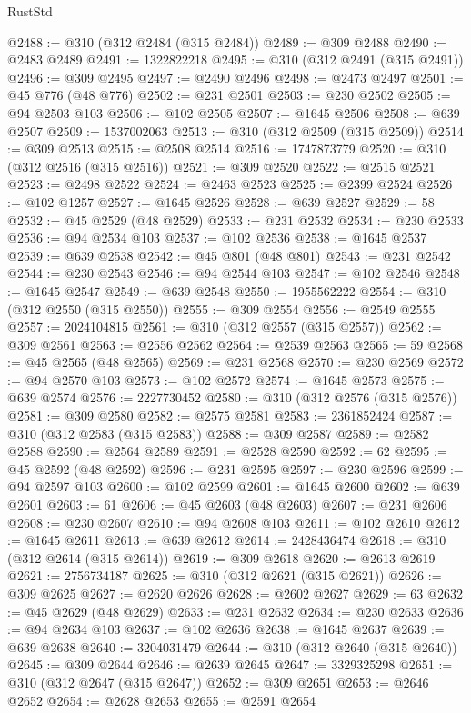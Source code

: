 \begin{lexlean}{RustStd}
\begin{coremodule}
@2488 := @310 (@312 @2484 (@315 @2484))
@2489 := @309 @2488
@2490 := @2483 @2489
@2491 := 1322822218
@2495 := @310 (@312 @2491 (@315 @2491))
@2496 := @309 @2495
@2497 := @2490 @2496
@2498 := @2473 @2497
@2501 := @45 @776 (@48 @776)
@2502 := @231 @2501
@2503 := @230 @2502
@2505 := @94 @2503 @103
@2506 := @102 @2505
@2507 := @1645 @2506
@2508 := @639 @2507
@2509 := 1537002063
@2513 := @310 (@312 @2509 (@315 @2509))
@2514 := @309 @2513
@2515 := @2508 @2514
@2516 := 1747873779
@2520 := @310 (@312 @2516 (@315 @2516))
@2521 := @309 @2520
@2522 := @2515 @2521
@2523 := @2498 @2522
@2524 := @2463 @2523
@2525 := @2399 @2524
@2526 := @102 @1257
@2527 := @1645 @2526
@2528 := @639 @2527
@2529 := 58
@2532 := @45 @2529 (@48 @2529)
@2533 := @231 @2532
@2534 := @230 @2533
@2536 := @94 @2534 @103
@2537 := @102 @2536
@2538 := @1645 @2537
@2539 := @639 @2538
@2542 := @45 @801 (@48 @801)
@2543 := @231 @2542
@2544 := @230 @2543
@2546 := @94 @2544 @103
@2547 := @102 @2546
@2548 := @1645 @2547
@2549 := @639 @2548
@2550 := 1955562222
@2554 := @310 (@312 @2550 (@315 @2550))
@2555 := @309 @2554
@2556 := @2549 @2555
@2557 := 2024104815
@2561 := @310 (@312 @2557 (@315 @2557))
@2562 := @309 @2561
@2563 := @2556 @2562
@2564 := @2539 @2563
@2565 := 59
@2568 := @45 @2565 (@48 @2565)
@2569 := @231 @2568
@2570 := @230 @2569
@2572 := @94 @2570 @103
@2573 := @102 @2572
@2574 := @1645 @2573
@2575 := @639 @2574
@2576 := 2227730452
@2580 := @310 (@312 @2576 (@315 @2576))
@2581 := @309 @2580
@2582 := @2575 @2581
@2583 := 2361852424
@2587 := @310 (@312 @2583 (@315 @2583))
@2588 := @309 @2587
@2589 := @2582 @2588
@2590 := @2564 @2589
@2591 := @2528 @2590
@2592 := 62
@2595 := @45 @2592 (@48 @2592)
@2596 := @231 @2595
@2597 := @230 @2596
@2599 := @94 @2597 @103
@2600 := @102 @2599
@2601 := @1645 @2600
@2602 := @639 @2601
@2603 := 61
@2606 := @45 @2603 (@48 @2603)
@2607 := @231 @2606
@2608 := @230 @2607
@2610 := @94 @2608 @103
@2611 := @102 @2610
@2612 := @1645 @2611
@2613 := @639 @2612
@2614 := 2428436474
@2618 := @310 (@312 @2614 (@315 @2614))
@2619 := @309 @2618
@2620 := @2613 @2619
@2621 := 2756734187
@2625 := @310 (@312 @2621 (@315 @2621))
@2626 := @309 @2625
@2627 := @2620 @2626
@2628 := @2602 @2627
@2629 := 63
@2632 := @45 @2629 (@48 @2629)
@2633 := @231 @2632
@2634 := @230 @2633
@2636 := @94 @2634 @103
@2637 := @102 @2636
@2638 := @1645 @2637
@2639 := @639 @2638
@2640 := 3204031479
@2644 := @310 (@312 @2640 (@315 @2640))
@2645 := @309 @2644
@2646 := @2639 @2645
@2647 := 3329325298
@2651 := @310 (@312 @2647 (@315 @2647))
@2652 := @309 @2651
@2653 := @2646 @2652
@2654 := @2628 @2653
@2655 := @2591 @2654

\end{coremodule}
\end{lexlean}
